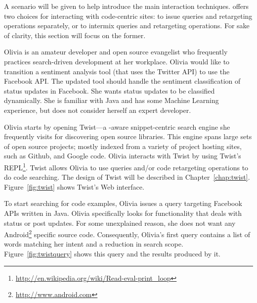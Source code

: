 A scenario will be given to help introduce the main interaction techniques. \uppercase{\Tool} offers two choices for interacting with code-centric sites: to issue queries and retargeting operations separately, or to intermix queries and retargeting operations. For sake of clarity, this section will focus on the former.

Olivia is an amateur developer and open source evangelist who frequently practices search-driven development at her workplace. Olivia would like to transition a sentiment analysis tool (that uses the Twitter API) to use the Facebook API. The updated tool should handle the sentiment classification of status updates in Facebook. She wants status updates to be classified dynamically. She is familiar with Java and has some Machine Learning experience, but does not consider herself an expert developer.

Olivia starts by opening Twist---a \uppercase{\Tool}-aware snippet-centric search engine she frequently visits for discovering open source libraries. This engine spans large sets of open source projects; mostly indexed from a variety of project hosting sites, such as Github, and Google code. Olivia interacts with Twist by using Twist's REPL\footnote{\url{http://en.wikipedia.org/wiki/Read-eval-print_loop}}. Twist allows Olivia to use queries and/or code retargeting operations to do code searching. The design of Twist will be described in Chapter~\ref{chap:twist}. Figure~\ref{fig:twist} shows Twist's Web interface. 


To start searching for code examples, Olivia issues a query targeting Facebook APIs written in Java. Olivia specifically looks for functionality that deals with status or post updates. For some unexplained reason, she does not want any Android\footnote{\url{http://www.android.com}} specific source code. Consequently, Olivia's first query contains a list of words matching her intent and a reduction in search scope. Figure~\ref{fig:twistquery} shows this query and the results produced by it. 


